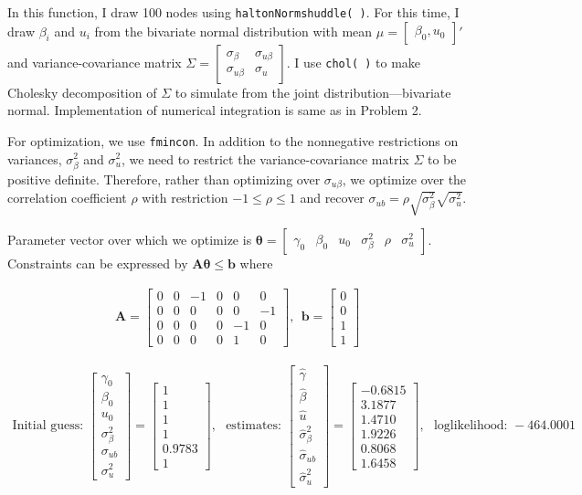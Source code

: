 \documentclass[11pt,letter]{article}
\newcommand{\vect}[1]{\boldsymbol{\mathbf{#1}}}
\newcounter{lem}[section] \setcounter{lem}{0}
\newcommand{\bmat}[1]{\begin{bmatrix} #1 \end{bmatrix}}%
\newcommand{\code}[1]{\texttt{#1}}
\begin{document}
In this function, I draw 100 nodes using \code{haltonNormshuddle( )}. For this time, I draw $\beta_i$ and $u_i$ from the bivariate normal distribution with mean $\mu=\bmat{\beta_0, u_0}'$ and variance-covariance matrix $\Sigma = \bmat{\sigma_\beta & \sigma_{u\beta} \\ \sigma_{u\beta} & \sigma_{u}}$. I use \code{chol( )} to make Cholesky decomposition of $\Sigma$ to simulate from the joint distribution---bivariate normal. Implementation of numerical integration is same as in Problem 2.

For optimization, we use \code{fmincon}. In addition to the nonnegative restrictions on variances, $\sigma_\beta^2$ and $\sigma_u^2$, we need to restrict the variance-covariance matrix $\Sigma$ to be positive definite. Therefore, rather than optimizing over $\sigma_{u\beta}$, we optimize over the correlation coefficient $\rho$ with restriction $-1\leq\rho\leq1$ and recover $\sigma_{ub} = \rho \sqrt{\sigma_\beta^2}\sqrt{\sigma_u^2}$. 

Parameter vector over which we optimize is $\vect{\theta}=\bmat{\gamma_0 & \beta_0 & u_0 & \sigma_\beta^2 & \rho & \sigma_u^2 }$. Constraints can be expressed by $\vect{A}\vect{\theta}\leq\vect{b}$ where

\begin{align*}
\vect{A} = \bmat{ 	0 & 0 & -1 & 0 & 0 & 0 \\
						0 & 0 &  0 & 0 & 0 & -1 \\
						0 & 0 &  0 & 0 & -1 & 0 \\
						0 & 0 &  0 & 0 & 1 & 0 },\ \ 
\vect{b} = \bmat{0\\ 0 \\ 1 \\ 1 }
\end{align*}



\begin{align*}
\text{Initial guess: }
\bmat{\gamma_0 \\ \beta_0  \\ u_0 \\ \sigma_\beta^2 \\ \sigma_{ub}\\ \sigma_u^2} 
=\bmat{1 \\ 1  \\ 1 \\ 1 \\ 0.9783 \\ 1}, \ \ \  
\text{estimates: }
\bmat{\hat{\gamma} \\ \hat{\beta}  \\ \hat{u} \\ \hat{\sigma}_\beta^2 \\ \hat{\sigma}_{ub}\\ \hat{\sigma}_u^2} 
=\bmat{-0.6815 \\ 3.1877  \\ 1.4710 \\ 1.9226 \\ 0.8068 \\ 1.6458}, \ \ \ 
\text{loglikelihood: }-464.0001
\end{align*}
\end{document}
